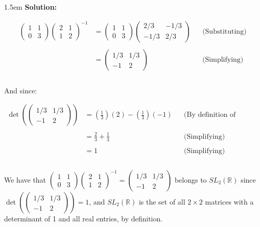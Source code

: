 \documentclass{article}
\newenvironment{solution}{
	\vspace{.5em}
	\par
	\begin{adjustwidth}{1.5em}{}
	\textbf{{Solution:}}
	\par
	\vspace{.5em}
}{
	\vspace{1em}
	\end{adjustwidth}
	\setcounter{step}{0}
}
\newcounter{step}
\begin{document}
\begin{solution}
	\begin{align*}
		\begin{pmatrix}
			1 & 1 \\
			0 & 3
		\end{pmatrix}
		\begin{pmatrix}
			2 & 1 \\
			1 & 2
		\end{pmatrix}^{-1}
		&= \begin{pmatrix}
			1 & 1 \\
			0 & 3
		\end{pmatrix}
		\begin{pmatrix}
			2/3 & -1/3 \\
			-1/3 & 2/3
		\end{pmatrix}
		&&\text{(Substituting)} \\\\
		&= \begin{pmatrix}
			1/3 & 1/3 \\
			-1 & 2
		\end{pmatrix}
		&&\text{(Simplifying)} \\\\
	\end{align*}

	And since:

	\begin{align*}
		\det\left(\begin{pmatrix}
			1/3 & 1/3 \\
			-1 & 2
		\end{pmatrix}\right)
		&= \left(\frac{1}{3}\right)(2) - \left( \frac{1}{3} \right)(-1) &&\text{(By definition of determinant)} \\\\
		&= \frac{2}{3} + \frac{1}{3} &&\text{(Simplifying)} \\\\
		&= 1 &&\text{(Simplifying)} \\\\
	\end{align*}

	We have that $\begin{pmatrix} 1 & 1 \\ 0 & 3 \end{pmatrix}\begin{pmatrix} 2 & 1 \\ 1 &2 \end{pmatrix}^{-1} = \begin{pmatrix} 1/3 & 1/3 \\ -1 & 2 \end{pmatrix}$ belongs to $SL_{2}(\mathbb{R})$ since $\det\left( \begin{pmatrix} 1/3 & 1/3 \\ -1 & 2 \end{pmatrix} \right) = 1$, and $SL_{2}(\mathbb{R})$ is the set of all $2 \times 2$ matrices with a determinant of 1 and all real entries, by definition. \\


\end{solution}
\end{document}
